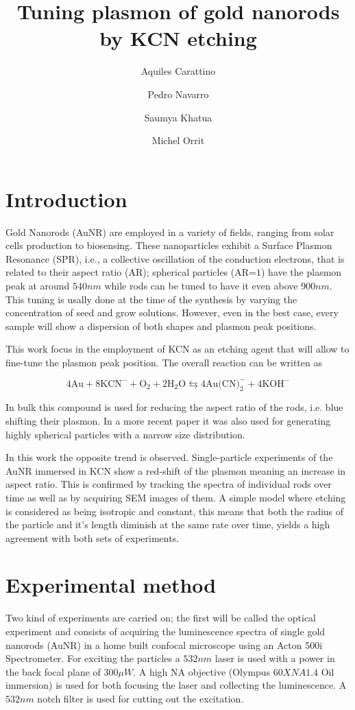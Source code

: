 \documentclass[twocolumn]{article}
\title{Tuning plasmon of gold nanorods by KCN etching}
\author{Aquiles Carattino \and Pedro Navarro \and Saumya Khatua \and Michel
Orrit}
\begin{document}
\maketitle
{}

\section{Introduction}
Gold Nanorods (AuNR) are employed in a variety of fields, ranging from solar
cells production\cite{Catchpole:08} to biosensing. These nanoparticles exhibit a
Surface Plasmon Resonance (SPR), i.e., a collective oscillation of the
conduction electrons, that is related to their aspect ratio (AR); spherical
particles (AR=$1$) have the plasmon peak at around $540nm$ while rods can be
tuned to have it even above $900nm$. This tuning is usally done at the time of
the synthesis by varying the concentration of seed and grow solutions. However,
even in the best case, every sample will show a dispersion of both shapes and 
plasmon peak positions.

This work focus in the employment of KCN as an etching agent that will allow to
fine-tune the plasmon peak position. The overall reaction can be written as 

\begin{equation}
4\textrm{Au} + 8\textrm{KCN}^-+\textrm{O}_2 + 2\textrm{H}_2\textrm{O}
\leftrightarrows 4\textrm{Au(CN)}_2^-+4\textrm{KOH}^-
\end{equation}

In bulk this compound is used for reducing the aspect ratio of the rods, i.e.
blue shifting their plasmon. In a more recent paper it was also used for
generating highly spherical particles with a narrow size distribution. 

In this work the opposite trend is observed. Single-particle experiments of the
AuNR immersed in KCN show a red-shift of the plasmon meaning an increase in
aspect ratio. This is confirmed by tracking the spectra of individual rods over
time as well as by acquiring SEM images of them. A simple model where etching is
considered as being isotropic and constant, this means that both the radius of
the particle and it's length diminish at the same rate over time, yields a high
agreement with both sets of experiments. 

\section{Experimental method}
Two kind of experiments are carried on; the first will be called the optical
experiment and consists of acquiring the luminescence spectra of single gold
nanorods (AuNR) in a home built confocal microscope using an Acton 500i
Spectrometer. For exciting the particles a $532nm$ laser is used with a power
in the back focal plane of $300\mu W$. A high NA objective (Olympus $60X NA 1.4$
Oil immersion) is used for both focusing the laser and collecting the
luminescence. A $532nm$ notch filter is used for cutting out the excitation.
\end{document}
